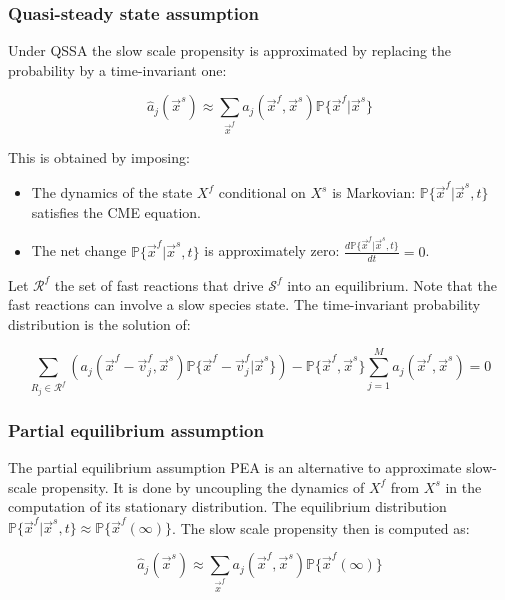     \subsubsection{Quasi-steady state assumption}
    Under QSSA the slow scale propensity is approximated by replacing the probability by a time-invariant one:

    $$\hat{a}_j(\vec{x}^s)\approx\sum\limits_{\vec{x}^f}a_j(\vec{x}^f, \vec{x}^s)\mathbb{P}\{\vec{x}^f|\vec{x}^s\}$$

    This is obtained by imposing:

    \begin{multicols}{2}
      \begin{itemize}
        \item The dynamics of the state $X^f$ conditional on $X^s$ is Markovian: $\mathbb{P}\{\vec{x}^f|\vec{x}^s,t\}$ satisfies the CME equation.
        \item The net change $\mathbb{P}\{\vec{x}^f|\vec{x}^s,t\}$ is approximately zero: $\frac{d\mathbb{P}\{\vec{x}^f|\vec{x}^s,t\}}{dt} = 0$.
      \end{itemize}
    \end{multicols}

    Let $\mathcal{R}^f$ the set of fast reactions that drive $\mathcal{S}^f$ into an equilibrium.
    Note that the fast reactions can involve a slow species state.
    The time-invariant probability distribution is the solution of:

    $$\sum\limits_{R_j\in\mathcal{R}^f}(a_j(\vec{x}^f-\vec{v}_j^f,\vec{x}^s)\mathbb{P}\{\vec{x}^f-\vec{v}_j^f|\vec{x}^s\})-\mathbb{P}\{\vec{x}^f,\vec{x}^s\}\sum\limits_{j=1}^Ma_j(\vec{x}^f,\vec{x}^s) = 0$$

    \subsubsection{Partial equilibrium assumption}
    The partial equilibrium assumption PEA is an alternative to approximate slow-scale propensity.
    It is done by uncoupling the dynamics of $X^f$ from $X^s$ in the computation of its stationary distribution.
    The equilibrium distribution $\mathbb{P}\{\vec{x}^f|\vec{x}^s,t\}\approx\mathbb{P}\{\vec{x}^f(\infty)\}$.
    The slow scale propensity then is computed as:

    $$\hat{a}_j(\vec{x}^s)\approx\sum\limits_{\vec{x}^f}a_j(\vec{x}^f, \vec{x}^s)\mathbb{P}\{\vec{x}^f(\infty)\}$$

